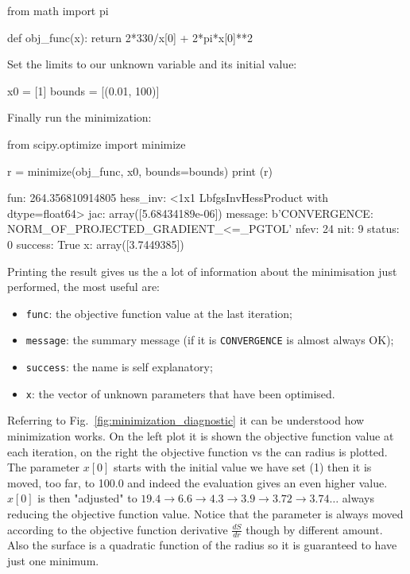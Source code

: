 \begin{ipython}
from math import pi

def obj_func(x):
    return 2*330/x[0] + 2*pi*x[0]**2
\end{ipython}

Set the limits to our unknown variable and its initial value:

\begin{ipython}
x0 = [1]
bounds = [(0.01, 100)]
\end{ipython}

Finally run the minimization:

\begin{ipython}
from scipy.optimize import minimize

r = minimize(obj_func, x0, bounds=bounds)
print (r)
\end{ipython}
\begin{ioutput}
      fun: 264.356810914805
 hess_inv: <1x1 LbfgsInvHessProduct with dtype=float64>
      jac: array([5.68434189e-06])
  message: b'CONVERGENCE: NORM_OF_PROJECTED_GRADIENT_<=_PGTOL'
     nfev: 24
      nit: 9
   status: 0
  success: True
        x: array([3.7449385])
\end{ioutput}

Printing the result gives us the a lot of information about the minimisation just performed, the most useful are:
\begin{itemize}
\item \texttt{func}: the objective function value at the last iteration;
\item \texttt{message}: the summary message (if it is \texttt{CONVERGENCE} is almost always OK);
\item \texttt{success}: the name is self explanatory;
\item \texttt{x}: the vector of unknown parameters that have been optimised.
\end{itemize}

Referring to Fig.~\ref{fig:minimization_diagnostic} it can be understood how minimization works. On the left plot it is shown the objective function value at each iteration, on the right the objective function vs the can radius is plotted.
The parameter $x[0]$ starts with the initial value we have set (1) then it is moved, too far, to 100.0 and indeed the evaluation gives an even higher value. $x[0]$ is then "adjusted" to $19.4\rightarrow 6.6\rightarrow 4.3\rightarrow 3.9\rightarrow 3.72\rightarrow 3.74\ldots$ always reducing the objective function value. Notice that the parameter is always moved according to the objective function derivative $\frac{dS}{dr}$ though by different amount.
Also the surface is a quadratic function of the radius so it is guaranteed to have just one minimum.

